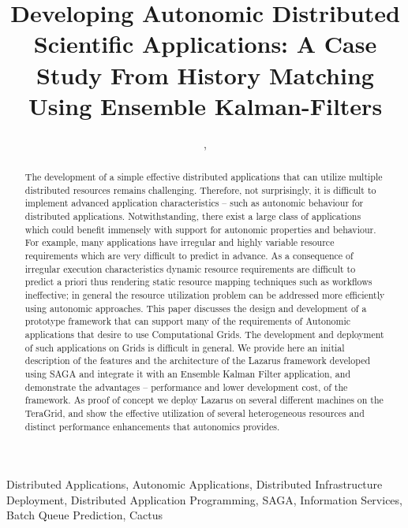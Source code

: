 \documentclass[conference,final]{IEEEtran}
\begin{document}
\title{\large Developing Autonomic Distributed Scientific
  Applications: A Case Study From History Matching Using Ensemble
  Kalman-Filters}
  
\author{,
   }
\maketitle
 \begin{abstract}
   The development of a simple effective distributed applications that
   can utilize multiple distributed resources remains challenging.
   Therefore, not surprisingly, it is difficult to implement advanced
   application characteristics -- such as autonomic behaviour for
   distributed applications. Notwithstanding, there exist a large
   class of applications which could benefit immensely with support
   for autonomic properties and behaviour.  For example, many
   applications have irregular and highly variable resource
   requirements which are very difficult to predict in advance.  As a
   consequence of irregular execution characteristics dynamic resource
   requirements are difficult to predict a priori thus rendering
   static resource mapping techniques such as workflows ineffective;
   in general the resource utilization problem can be addressed more
   efficiently using autonomic approaches.  This paper discusses the
   design and development of a prototype framework that can support
   many of the requirements of Autonomic applications that desire to
   use Computational Grids.  The development and deployment of such
   applications on Grids is difficult in general.  We provide here an
   initial description of the features and the architecture of the
   Lazarus framework developed using SAGA and integrate it with an
   Ensemble Kalman Filter application, and demonstrate the advantages
   -- performance and lower development cost, of the framework.  As
   proof of concept we deploy Lazarus on several different machines on
   the TeraGrid, and show the effective utilization of several
   heterogeneous resources and distinct performance enhancements that
   autonomics provides.
 \end{abstract}
 \begin{keywords}
   Distributed Applications, Autonomic Applications, Distributed
   Infrastructure Deployment, Distributed Application Programming,
   SAGA, Information Services, Batch Queue Prediction, Cactus
 \end{keywords}
\end{document}
